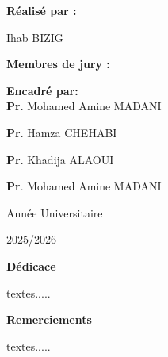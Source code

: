\documentclass[a4paper,12pt]{report}
\begin{document}
\begin{titlepage}
\begin{center}
\end{center}
\vspace{1cm}
\begin{center}
        \textbf {Réalisé par :}\bigskip

            Ihab BIZIG\par

\end{center}
\vspace{1cm}


\textbf {Membres de jury :}\hfill\parbox[t]{6cm}{\textbf{Encadré par:\\}\textbf{Pr}. Mohamed Amine MADANI}\par
\textbf {Pr}. Hamza CHEHABI\par
\textbf {Pr}. Khadija ALAOUI\par
\textbf {Pr}. Mohamed Amine MADANI\par


\vfill
\begin{center}
 \hrulefill\par
 \vspace{0.5cm}
    Année Universitaire \par
    2025/2026
\end{center}

\end{titlepage}


\restoregeometry
\newpage
\thispagestyle {empty}
    \begin {center}
    \Large\textbf {Dédicace}
    \end {center}
 textes.....
\newpage
\thispagestyle {empty}
    \begin {center}
    \Large\textbf {Remerciements}
    \end {center}
 textes.....
\newpage

   \begin {abstract}
textes...
   \end {abstract}

\newpage
    \begin {abstract}

    \end {abstract}

\newpage



\tableofcontents{}




\thispagestyle {empty}

\newpage
\end{document}
